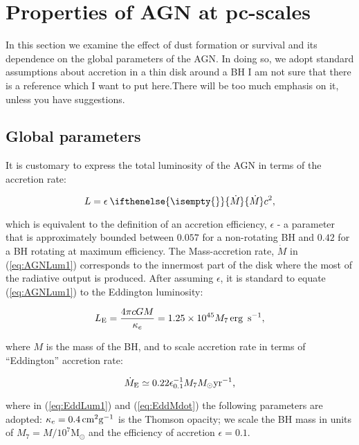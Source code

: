 \documentclass[12pt,english,preprint]{aastex}
\newcommand{\red}{\color{red}}
\newcommand{\Mdt}[1][]{ 
    \ifthenelse{\isempty{#1}}
    {\dot{M}_{}}
    { {\dot M}_{{#1}} } 
} %
\begin{document}
\section{Properties of AGN at pc-scales}

In this section we examine the effect of dust formation or survival and its dependence on the global parameters of the 
AGN.   
In doing so, we adopt standard assumptions about accretion in a thin disk around a BH 
{\red I am not sure that there is a reference which I want to put here.There will be too
much emphasis on it, unless you have suggestions}.


\subsection{Global parameters }

It is customary to express the total luminosity of the AGN in terms of the accretion rate:


\begin{equation}
L=\epsilon\:\Mdt c^{2},\label{eq:AGNLum1}
\end{equation}

\noindent which is equivalent to the definition of an accretion efficiency, $\epsilon$ -
a parameter that is approximately bounded between $0.057$
for a non-rotating BH and $0.42$ for a BH rotating at maximum efficiency.
The Mass-accretion rate, ${\dot{M}}$ in (\ref{eq:AGNLum1}) corresponds
to the innermost part of the disk where the most of the radiative output
is produced. After assuming $\epsilon$, it is standard to equate (\ref{eq:AGNLum1}) to the Eddington luminosity:



\begin{equation}
L_{{\rm E}}=\frac{4\pi cGM}{\kappa_{e}}=1.25\times10^{45}M_{7}\text{\text{\,erg} }\,{\rm s}^{-1},\label{eq:EddLum1}
\end{equation}

\noindent where $M$ is the mass of the BH, and to scale accretion rate in terms
of ``Eddington'' accretion rate:

\begin{equation}
\dot{M}_{{\rm E}}\simeq0.22\epsilon_{0.1}^{-1}M_{7}M_{\odot}{\rm yr}^{-1}\mbox{,}\label{eq:EddMdot}
\end{equation}


\noindent where in (\ref{eq:EddLum1}) and (\ref{eq:EddMdot}) the following
parameters are adopted: $\kappa_{e}=0.4\,{\rm cm^{2}g^{-1}}$ is the
Thomson opacity; we scale the BH mass in units of $M_{7}=M/10^{7}\text{M}_{\odot}$
and the efficiency of accretion $\epsilon=0.1$. 
\end{document}
